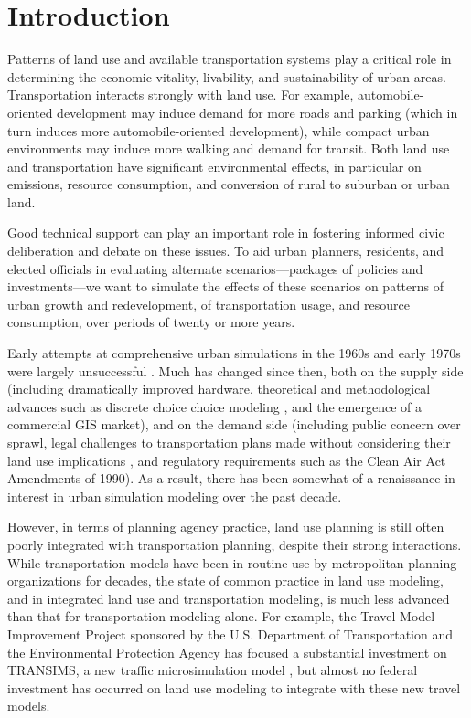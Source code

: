 
\section{Introduction}
\label{sec:introduction}

Patterns of land use and available transportation systems play a
critical role in determining the economic vitality, livability,
and sustainability of urban areas.  Transportation interacts
strongly with land use.  For example, automobile-oriented
development may induce demand for more roads and parking (which in
turn induces more automobile-oriented development), while compact
urban environments may induce more walking and demand for transit.
Both land use and transportation have significant environmental
effects, in particular on emissions, resource consumption, and
conversion of rural to suburban or urban land.

Good technical support can play an important role in fostering informed
civic deliberation and debate on these issues.  To aid urban planners,
residents, and elected officials in evaluating alternate
scenarios---packages of policies and investments---we want to simulate the
effects of these scenarios on patterns of urban growth and redevelopment,
of transportation usage, and resource consumption, over periods of twenty
or more years.

Early attempts at comprehensive urban simulations in the 1960s and
early 1970s were largely unsuccessful \citep{lee-1973,lee-1994}.
Much has changed since then, both on the supply side (including
dramatically improved hardware, theoretical and methodological
advances such as discrete choice choice modeling
\citep{mcfadden-1973,mcfadden-iatbr-2000}, and the emergence of a
commercial GIS market), and on the demand side (including public
concern over sprawl, legal challenges to transportation plans made
without considering their land use implications
\citep{garret-1996}, and regulatory requirements such as the Clean
Air Act Amendments of 1990).  As a result, there has been somewhat
of a renaissance in interest in urban simulation modeling over the
past decade.

However, in terms of planning agency practice, land use planning
is still often poorly integrated with transportation planning,
despite their strong interactions.  While transportation models
have been in routine use by metropolitan planning organizations
for decades, the state of common practice in land use modeling,
and in integrated land use and transportation modeling, is much
less advanced than that for transportation modeling alone.  For
example, the Travel Model Improvement Project sponsored by the
U.S. Department of Transportation and the Environmental Protection
Agency has focused a substantial investment on TRANSIMS, a new
traffic microsimulation model \citep{TRANSIMS-1999}, but almost no
federal investment has occurred on land use modeling to integrate
with these new travel models.

